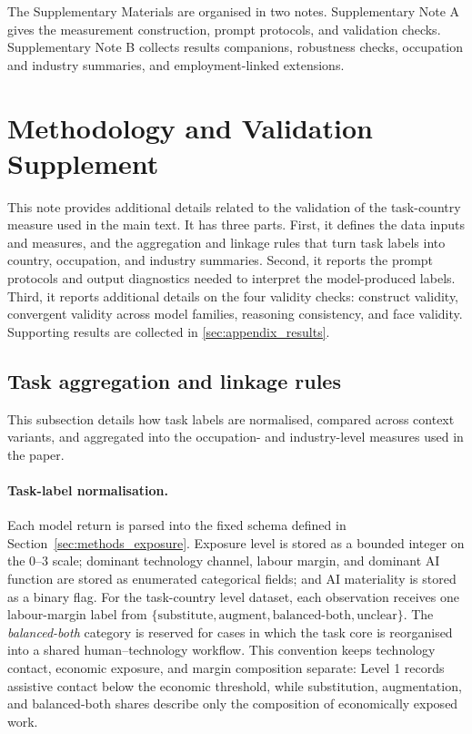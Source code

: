 \documentclass[11pt]{article}
\begin{document}
\vspace{1em}
\noindent The Supplementary Materials are organised in two notes. Supplementary Note A gives the measurement construction, prompt protocols, and validation checks. Supplementary Note B collects results companions, robustness checks, occupation and industry summaries, and employment-linked extensions.

\section{Methodology and Validation Supplement}
\label{sec:appendix_methodology}

\noindent This note provides additional details related to the validation of the task-country measure used in the main text. It has three parts. First, it defines the data inputs and measures, and the aggregation and linkage rules that turn task labels into country, occupation, and industry summaries. Second, it reports the prompt protocols and output diagnostics needed to interpret the model-produced labels. Third, it reports additional details on the four validity checks: construct validity, convergent validity across model families, reasoning consistency, and face validity. Supporting results are collected in \ref{sec:appendix_results}.

\FloatBarrier
\subsection{Task aggregation and linkage rules}
\label{sec:appendix_methods_audit}
This subsection details how task labels are normalised, compared across context variants, and aggregated into the occupation- and industry-level measures used in the paper.

\paragraph{Task-label normalisation.} Each model return is parsed into the fixed schema defined in Section~\ref{sec:methods_exposure}. Exposure level is stored as a bounded integer on the $0$--$3$ scale; dominant technology channel, labour margin, and dominant AI function are stored as enumerated categorical fields; and AI materiality is stored as a binary flag. For the task-country level dataset, each observation receives one labour-margin label from $\{\text{substitute},\text{augment},\text{balanced-both},\text{unclear}\}$. The \textit{balanced-both} category is reserved for cases in which the task core is reorganised into a shared human--technology workflow. This convention keeps technology contact, economic exposure, and margin composition separate: Level 1 records assistive contact below the economic threshold, while substitution, augmentation, and balanced-both shares describe only the composition of economically exposed work.
\end{document}
